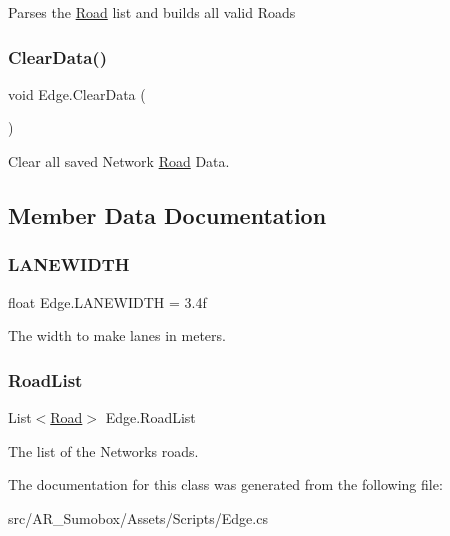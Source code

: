 Parses the \mbox{\hyperlink{struct_road}{Road}} list and builds all valid Roads 

\mbox{\label{class_edge_a2ec64470c2a869696dfba6b5fdd9cf0b}} 
\subsubsection{\texorpdfstring{ClearData()}{ClearData()}}
{\footnotesize\ttfamily void Edge.\+Clear\+Data (\begin{DoxyParamCaption}{ }\end{DoxyParamCaption})}



Clear all saved Network \mbox{\hyperlink{struct_road}{Road}} Data. 



\subsection{Member Data Documentation}
\mbox{\label{class_edge_abce1274185524bbf90f49b8214130fd1}} 
\subsubsection{\texorpdfstring{LANEWIDTH}{LANEWIDTH}}
{\footnotesize\ttfamily float Edge.\+L\+A\+N\+E\+W\+I\+D\+TH = 3.\+4f}



The width to make lanes in meters. 

\mbox{\label{class_edge_ada376fd8a81711e44ab425c32a85e844}} 
\subsubsection{\texorpdfstring{RoadList}{RoadList}}
{\footnotesize\ttfamily List$<$\mbox{\hyperlink{struct_road}{Road}}$>$ Edge.\+Road\+List}



The list of the Networks roads. 



The documentation for this class was generated from the following file\+:\begin{DoxyCompactItemize}
\item 
src/\+A\+R\+\_\+\+Sumobox/\+Assets/\+Scripts/Edge.\+cs\end{DoxyCompactItemize}
